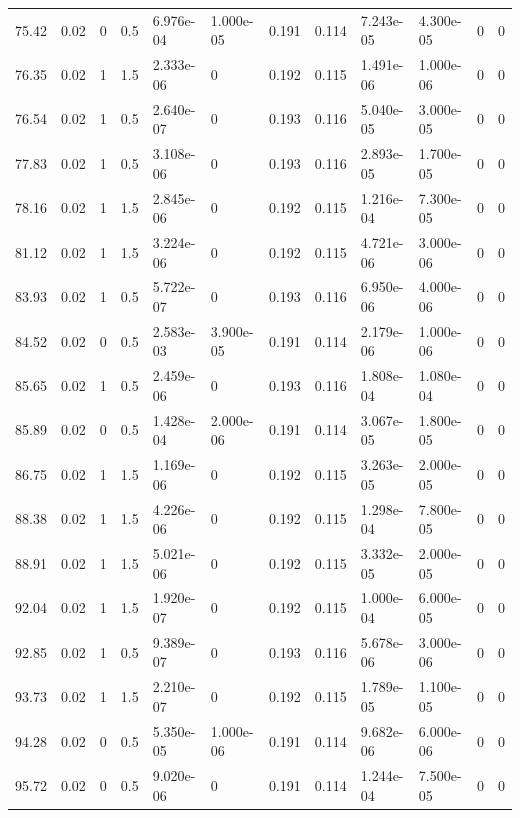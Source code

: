 \documentclass[preview]{standalone}
\begin{document}
{{{\begin{tabular}{L{1.2cm}C{1.2cm} C{0.3cm}C{0.5cm} C{1.4cm}C{1.4cm} C{1.4cm}C{1.4cm} C{1.6cm}C{1.6cm} C{1.6cm}C{1.6cm}}
  75.42  &  0.02  & 0     & 0.5 &  6.976e-04  & 1.000e-05  &  0.191&   0.114& 7.243e-05 & 4.300e-05   &  0 & 0  \\ 
  76.35  &  0.02  & 1     & 1.5 &  2.333e-06  & 0  &  0.192&   0.115& 1.491e-06 & 1.000e-06   &  0 & 0  \\ 
  76.54  &  0.02  & 1     & 0.5 &  2.640e-07  & 0  &  0.193&   0.116& 5.040e-05 & 3.000e-05   &  0 & 0  \\ 
  77.83  &  0.02  & 1     & 0.5 &  3.108e-06  & 0  &  0.193&   0.116& 2.893e-05 & 1.700e-05   &  0 & 0  \\ 
  78.16  &  0.02  & 1     & 1.5 &  2.845e-06  & 0  &  0.192&   0.115& 1.216e-04 & 7.300e-05   &  0 & 0  \\ 
  81.12  &  0.02  & 1     & 1.5 &  3.224e-06  & 0  &  0.192&   0.115& 4.721e-06 & 3.000e-06   &  0 & 0  \\ 
  83.93  &  0.02  & 1     & 0.5 &  5.722e-07  & 0  &  0.193&   0.116& 6.950e-06 & 4.000e-06   &  0 & 0  \\ 
  84.52  &  0.02  & 0     & 0.5 &  2.583e-03  & 3.900e-05  &  0.191&   0.114& 2.179e-06 & 1.000e-06   &  0 & 0  \\ 
  85.65  &  0.02  & 1     & 0.5 &  2.459e-06  & 0  &  0.193&   0.116& 1.808e-04 & 1.080e-04   &  0 & 0  \\ 
  85.89  &  0.02  & 0     & 0.5 &  1.428e-04  & 2.000e-06  &  0.191&   0.114& 3.067e-05 & 1.800e-05   &  0 & 0  \\ 
  86.75  &  0.02  & 1     & 1.5 &  1.169e-06  & 0  &  0.192&   0.115& 3.263e-05 & 2.000e-05   &  0 & 0  \\ 
  88.38  &  0.02  & 1     & 1.5 &  4.226e-06  & 0  &  0.192&   0.115& 1.298e-04 & 7.800e-05   &  0 & 0  \\ 
  88.91  &  0.02  & 1     & 1.5 &  5.021e-06  & 0  &  0.192&   0.115& 3.332e-05 & 2.000e-05   &  0 & 0  \\ 
  92.04  &  0.02  & 1     & 1.5 &  1.920e-07  & 0  &  0.192&   0.115& 1.000e-04 & 6.000e-05   &  0 & 0  \\ 
  92.85  &  0.02  & 1     & 0.5 &  9.389e-07  & 0  &  0.193&   0.116& 5.678e-06 & 3.000e-06   &  0 & 0  \\ 
  93.73  &  0.02  & 1     & 1.5 &  2.210e-07  & 0  &  0.192&   0.115& 1.789e-05 & 1.100e-05   &  0 & 0  \\ 
  94.28  &  0.02  & 0     & 0.5 &  5.350e-05  & 1.000e-06  &  0.191&   0.114& 9.682e-06 & 6.000e-06   &  0 & 0  \\ 
  95.72  &  0.02  & 0     & 0.5 &  9.020e-06  & 0  &  0.191&   0.114& 1.244e-04 & 7.500e-05   &  0 & 0  \\ 

\end{tabular}}}}
\end{document}
